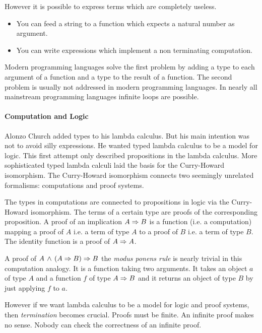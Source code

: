 However it is possible to express terms which are completely useless.

\begin{itemize}

\item You can feed a string to a function which expects a natural number as
argument.

\item You can write expressions which implement a non terminating computation.

\end{itemize}

Modern programming languages solve the first problem by adding a type to each
argument of a function and a type to the result of a function. The second
problem is usually not addressed in modern programming languages. In nearly all
mainstream programming languages infinite loops are possible.





\paragraph{Computation and Logic}
Alonzo Church added types to his lambda calculus. But his main intention was not
to avoid silly expressions. He wanted typed lambda calculus to be a model for
logic. This first attempt only described propositions in the lambda calculus.
More sophisticated typed lambda calculi laid the basis for the Curry-Howard
isomorphism. The Curry-Howard isomorphism connects two seemingly unrelated
formalisms: computations and proof systems.

The types in computations are connected to propositions in logic via the
Curry-Howard isomorphism. The terms of a certain type are proofs of the
corresponding proposition. A proof of an implication $A \Rightarrow B$ is a function
(i.e. a computation) mapping a proof of $A$ i.e. a term of type $A$ to a
proof of $B$ i.e. a term of type $B$. The identity function is a proof of $A
\Rightarrow A$.

A proof of $A\, \land\, (A \Rightarrow B) \Rightarrow B$ the \emph{modus ponens rule} is nearly
trivial in this computation analogy. It is a function taking two arguments. It
takes an object $a$ of type $A$ and a function $f$ of type $A \Rightarrow B$ and it
returns an object of type $B$ by just applying $f$ to $a$.

However if we want lambda calculus to be a model for logic and proof systems,
then \emph{termination} becomes crucial. Proofs must be finite. An infinite
proof makes no sense. Nobody can check the correctness of an infinite proof.


